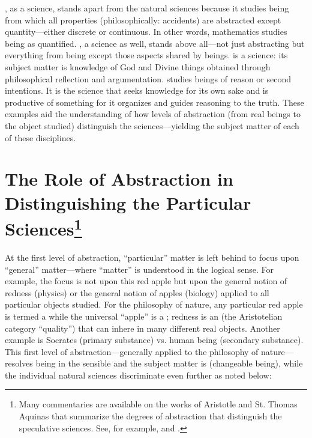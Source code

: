 , as a science, stands apart from the natural sciences because it studies being from which all properties (philosophically: accidents) are abstracted except quantity---either discrete or continuous. In other words, mathematics studies being as quantified. , a science as well, stands above all---not just abstracting but  everything from being except those aspects shared by  beings.  is a science: its subject matter is knowledge of God and Divine things obtained through philosophical reflection and argumentation.  studies beings of reason or second intentions. It is the science that seeks knowledge for its own sake and is productive of something for it organizes and guides reasoning to the truth. These examples aid the understanding of how levels of abstraction (from real beings to the object studied) distinguish the sciences---yielding the subject matter of each of these disciplines.


\section[The Role of Abstraction]{The Role of Abstraction in Distinguishing the Particular Sciences\footnote{Many commentaries are available on the works of Aristotle and St. Thomas Aquinas that summarize the degrees of abstraction that distinguish the speculative sciences. See, for example, \citet[][pgs. 35--36]{maritain1959} and \citet[][pgs. 51--53]{velde2006}.}}

At the first level of abstraction, ``particular'' matter is left behind to focus upon ``general'' matter---where ``matter'' is understood in the logical sense. For example, the focus is not upon this red apple but upon the general notion of redness (physics) or the general notion of apples (biology)  applied to all particular objects studied. For the philosophy of nature, any particular red apple is termed a  while the universal ``apple'' is a ; redness is an  (the Aristotelian category ``quality'') that can inhere in many different real objects. Another example is Socrates (primary substance) vs. human being (secondary substance). This first level of abstraction---generally applied to the philosophy of nature---resolves being in the sensible and the subject matter is  (changeable being), while the individual natural sciences discriminate even further as noted below:


